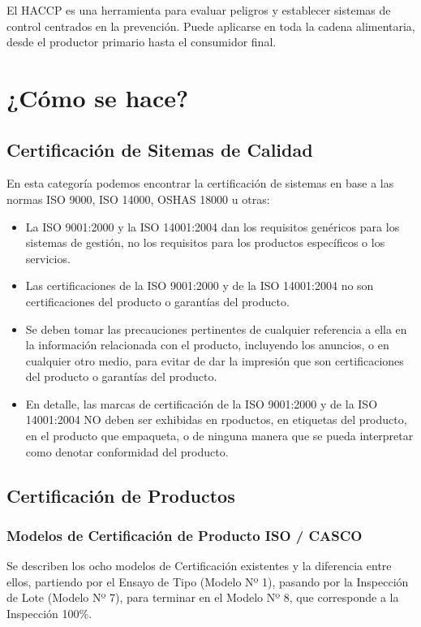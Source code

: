 El HACCP es una herramienta para evaluar peligros y establecer sistemas de control centrados en la prevención. Puede aplicarse en toda la cadena alimentaria, desde el productor primario hasta el consumidor final.

\section{¿Cómo se hace?}

\subsection{Certificación de Sitemas de Calidad}

En esta categoría podemos encontrar la certificación de sistemas en base a las normas ISO 9000, ISO 14000, OSHAS 18000 u otras:
\begin{itemize}
    \item La ISO 9001:2000 y la ISO 14001:2004 dan los requisitos genéricos para los sistemas de gestión, no los requisitos para los productos específicos o los servicios.
    \item Las certificaciones de la ISO 9001:2000 y de la ISO 14001:2004 no son certificaciones del producto o garantías del producto.
    \item Se deben tomar las precauciones pertinentes de cualquier referencia a ella en la información relacionada con el producto, incluyendo los anuncios, o en cualquier otro medio, para evitar de dar la impresión que son certificaciones del producto o garantías del producto.
    \item En detalle, las marcas de certificación de la ISO 9001:2000 y de la ISO 14001:2004 NO deben ser exhibidas en rpoductos, en etiquetas del producto, en el producto que empaqueta, o de ninguna manera que se pueda interpretar como denotar conformidad del producto.
\end{itemize}

\subsection{Certificación de Productos}

\subsubsection{Modelos de Certificación de Producto ISO / CASCO}
Se describen los ocho modelos de Certificación existentes y la diferencia entre ellos, partiendo por el Ensayo de Tipo (Modelo Nº 1), pasando por la Inspección de Lote (Modelo Nº 7), para terminar en el Modelo Nº 8, que corresponde a la Inspección 100\%.

